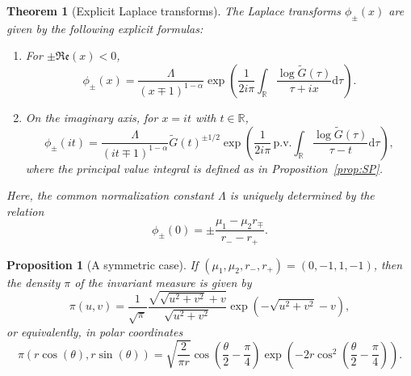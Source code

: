 \documentclass[10pt,a4paper]{amsart}
\newtheorem{proposition}{Proposition}
\newtheorem{theorem}{Theorem}
\begin{document}
\begin{theorem}[Explicit Laplace transforms]\label{thm:laplace} 
The Laplace transforms $\phi_\pm(x)$ are given by the following explicit formulas:
\begin{enumerate}
    \item[(a)] For $\pm \mathfrak{Re}(x) < 0$,
    \begin{equation*}
        \phi_\pm(x) = \frac{\Lambda}{(x \mp 1)^{1-\alpha}} \exp\left(\frac{1}{2i\pi} \int_{\mathbb{R}} \frac{\log\widetilde{G}(\tau)}{\tau+ix} \mathrm{d}\tau \right).
    \end{equation*}
    \item[(b)] On the imaginary axis, for $x=it$ with $t \in \mathbb{R}$,
    \begin{equation*}
        \phi_\pm(it) = \frac{\Lambda}{(it \mp 1)^{1-\alpha}} \widetilde{G}(t)^{\pm 1/2} \exp\left(\frac{1}{2i\pi} \,\mathrm{p.v.} \int_{\mathbb{R}} \frac{\log\widetilde{G}(\tau)}{\tau-t} \mathrm{d}\tau \right),
    \end{equation*}
    where the principal value integral is defined as in Proposition~\ref{prop:SP}.
\end{enumerate}
Here, the common normalization constant $\Lambda$ is uniquely determined by the relation
\begin{equation}\label{eq:normalization}
    \phi_\pm(0) = \pm \frac{\mu_1 - \mu_2 r_\mp}{r_- - r_+}.
\end{equation}
\end{theorem}

\begin{proposition}[A symmetric case]\label{prop:ex} If $(\mu_1,\mu_2,r_-,r_+)=(0,-1,1,-1)$, then the density $\pi$ of the invariant measure is given by
$$\pi(u,v)=\frac{1}{\sqrt{\pi}}\frac{\sqrt{\sqrt{u^2+v^2}+v}}{\sqrt{u^2+v^2}}\exp\left(-\sqrt{u^2+v^2}-v\right),$$
or equivalently, in polar coordinates
$$\pi(r\cos(\theta),r\sin(\theta))=\sqrt{\frac{2}{\pi r}}\cos\left(\frac{\theta}{2}-\frac{\pi}{4}\right)\exp\left(-2r\cos^2\left(\frac{\theta}{2}-\frac{\pi}{4}\right)\right).$$
\end{proposition}
\end{document}
